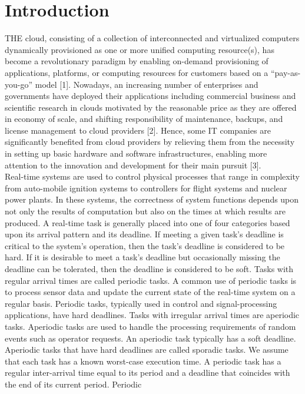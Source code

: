 \documentclass[conference]{IEEEtran}
\begin{document}
\section{Introduction}
THE cloud, consisting of a collection of interconnected and
virtualized computers dynamically provisioned as one
or more unified computing resource(s), has become a revolutionary
paradigm by enabling on-demand provisioning of
applications, platforms, or computing resources for customers
based on a “pay-as-you-go” model [1]. Nowadays, an
increasing number of enterprises and governments have
deployed their applications including commercial business
and scientific research in clouds motivated by the reasonable
price as they are offered in economy of scale, and shifting
responsibility of maintenance, backups, and license management
to cloud providers [2]. Hence, some IT companies are
significantly benefited from cloud providers by relieving
them from the necessity in setting up basic hardware and
software infrastructures, enabling more attention to the
innovation and development for their main pursuit [3].\\[10pt]
\space Real-time systems are used to control physical processes that range in complexity from
auto-mobile ignition systems to controllers for flight systems and nuclear power plants. In
these systems, the correctness of system functions depends upon not only the results of
computation but also on the times at which results are produced.
A real-time task is generally placed into one of four categories based upon its arrival
pattern and its deadline. If meeting a given task's deadline is critical to the system's operation,
then the task's deadline is considered to be hard. If it is desirable to meet a task's
deadline but occasionally missing the deadline can be tolerated, then the deadline is considered
to be soft. Tasks with regular arrival times are called periodic tasks. A common
use of periodic tasks is to process sensor data and update the current state of the real-time
system on a regular basis. Periodic tasks, typically used in control and signal-processing
applications, have hard deadlines. Tasks with irregular arrival times are aperiodic tasks.
Aperiodic tasks are used to handle the processing requirements of random events such as
operator requests. An aperiodic task typically has a soft deadline. Aperiodic tasks that have
hard deadlines are called sporadic tasks. We assume that each task has a known worst-case
execution time. A periodic task has a regular inter-arrival time equal
to its period and a deadline that coincides with the end of its current period. Periodic
\end{document}
